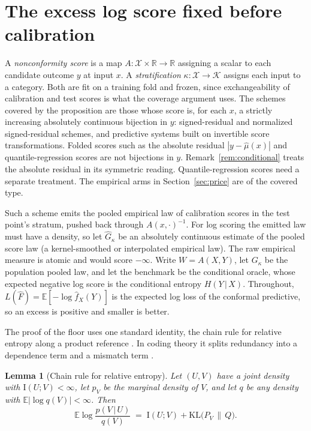 \documentclass[11pt]{article}
\newtheorem{lemma}[proposition]{Lemma}
\theoremstyle{remark}
\newcommand{\E}{\mathbb{E}}
\newcommand{\I}{\mathrm{I}}
\newcommand{\given}{\,|\,}
\newcommand{\KLop}{\mathrm{KL}}
\begin{document}
\section{The excess log score fixed before calibration}\label{sec:floor}

A \emph{nonconformity score} is a map $A:\mathcal{X}\times\mathbb{R}\to
\mathbb{R}$ assigning a scalar to each candidate outcome $y$ at input $x$. A
\emph{stratification} $\kappa:\mathcal{X}\to\mathcal{K}$ assigns each input to
a category. Both are fit on a training fold and frozen, since exchangeability
of calibration and test scores is what the coverage argument uses. The schemes
covered by the proposition are those whose score is, for each $x$, a strictly
increasing absolutely continuous bijection in $y$: signed-residual and
normalized signed-residual schemes, and predictive systems built on invertible
score transformations. Folded scores such as the absolute residual
$|y-\widehat\mu(x)|$ and quantile-regression scores are not bijections in $y$.
Remark~\ref{rem:conditional} treats the absolute residual in its symmetric
reading. Quantile-regression scores need a separate treatment. The empirical
arms in Section~\ref{sec:price} are of the covered type.

Such a scheme emits the pooled empirical law of calibration scores in the test
point's stratum, pushed back through $A(x,\cdot)^{-1}$. For log scoring the
emitted law must have a density, so let $\widehat G_\kappa$ be an absolutely
continuous estimate of the pooled score law (a kernel-smoothed or interpolated
empirical law). The raw empirical measure is atomic and would score $-\infty$. Write
$W=A(X,Y)$, let $G_\kappa$ be the population pooled law, and let the benchmark
be the conditional oracle, whose expected negative log score is the conditional
entropy $H(Y\given X)$. Throughout, $L(\widehat F)=\E[-\log \widehat f_X(Y)]$
is the expected log loss of the conformal predictive, so an excess is positive
and smaller is better.

The proof of the floor uses one standard identity, the chain rule for relative
entropy along a product reference \citep{cover2006elements}. In coding theory it
splits redundancy into a dependence term and a mismatch term
\citep{clarke1990,grunwald2007}.

\begin{lemma}[Chain rule for relative entropy]\label{lem:chain}
Let $(U,V)$ have a joint density with $\I(U;V)<\infty$, let $p_V$ be the marginal
density of $V$, and let $q$ be any density with $\E|\log q(V)|<\infty$. Then
\[
\E\log\frac{p(V\given U)}{q(V)} \;=\; \I(U;V)+\KLop\!\big(P_V\,\|\,Q\big).
\]
\end{lemma}
\end{document}
